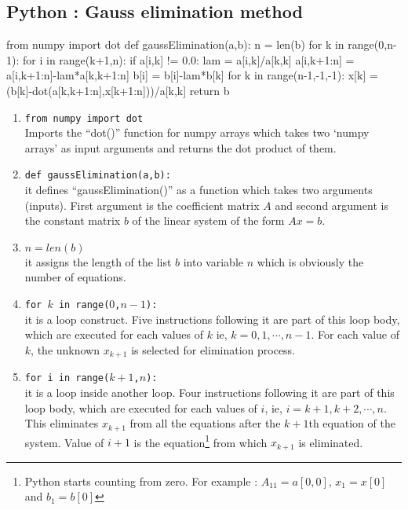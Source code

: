 \subsection{Python : Gauss elimination method}
\begin{program}
	\begin{python}
	from numpy import dot
	def gaussElimination(a,b):
		n = len(b)
		for k in range(0,n-1):
			for i in range(k+1,n):
				if a[i,k] != 0.0:
					lam = a[i,k]/a[k,k]
					a[i,k+1:n] = a[i,k+1:n]-lam*a[k,k+1:n]
					b[i] = b[i]-lam*b[k]
		for k in range(n-1,-1,-1):
			x[k] = (b[k]-dot(a[k,k+1:n],x[k+1:n]))/a[k,k]
		return b
	\end{python}
\end{program}

\begin{commentary}
\begin{enumerate}[label=Line \arabic*]
	\item \texttt{from numpy import dot} \\ Imports the ``dot()'' function for numpy arrays which takes two `numpy arrays' as input arguments and returns the dot product of them.
	\item \texttt{def gaussElimination(a,b):}\\ it defines ``gaussElimination()'' as a function which takes two arguments (inputs). First argument is the coefficient matrix $A$ and second argument is the constant matrix $b$ of the linear system of the form $Ax = b$.
	\item \texttt{$n = len(b)$}\\ it assigns the length of the list $b$ into variable $n$ which is obviously the number of equations.
	\item \texttt{for $k$ in range($0$,$n-1$):}  \\ it is a loop construct. Five instructions following it are part of this loop body, which are executed for each values of $k$ ie, $k = 0, 1, \cdots, n-1$. For each value of $k$, the unknown $x_{k+1}$ is selected for elimination process.
	\item \texttt{for i in range($k+1$,$n$):}\\ it is a loop inside another loop. Four instructions following it are part of this loop body, which are executed for each values of $i$, ie, $i = k+1, k+2, \cdots, n$. This eliminates $x_{k+1}$ from all the equations after the $k+1$th equation of the system. Value of $i+1$ is the equation\footnote{Python starts counting from zero. For example : $A_{11} = a[0,0]$, $x_1 = x[0]$ and $b_1 = b[0]$} from which $x_{k+1}$ is eliminated.

\end{enumerate}
\end{commentary}
